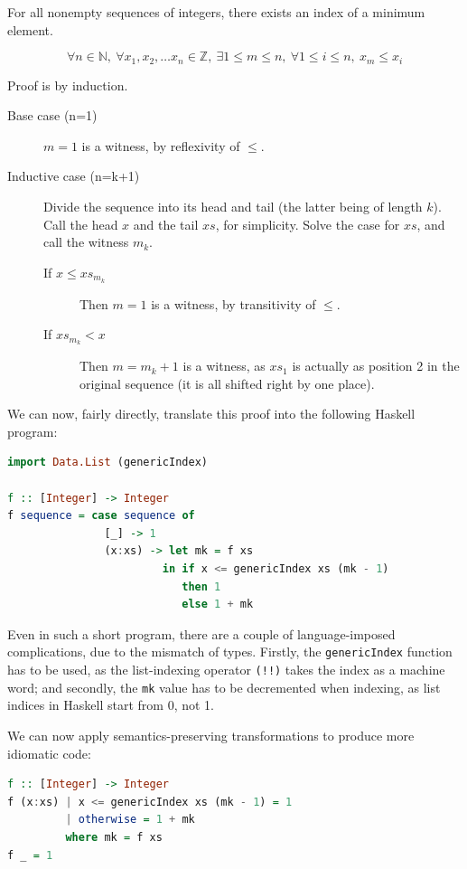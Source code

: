 \begin{example}
\label{exmpl:lit-extraction}
For all nonempty sequences of integers, there exists an index of a
minimum element.

\[\forall n \in \mathbb N,\
\forall x_{1}, x_{2}, \ldots x_{n} \in \mathbb Z,\ 
\exists 1 \leq m \leq n,\ 
\forall 1 \leq i \leq n,\ 
x_{m} \leq x_{i}\]

Proof is by induction.

\begin{description}
  \item[Base case (n=1)] $m = 1$ is a witness, by reflexivity of
    $\leq$.

  \item[Inductive case (n=k+1)] Divide the sequence into its head
    and tail (the latter being of length $k$). Call the head $x$ and
    the tail $xs$, for simplicity. Solve the case for $xs$, and call
    the witness $m_{k}$.
    \begin{description}
      \item[If $x \leq xs_{m_k}$] Then $m = 1$ is a witness, by
        transitivity of $\leq$.

      \item[If $xs_{m_k} < x$] Then $m = m_{k} + 1$ is a witness, as
        $xs_{1}$ is actually as position 2 in the original sequence
        (it is all shifted right by one place).
    \end{description}
\end{description}

We can now, fairly directly, translate this proof into the following
Haskell program:

\begin{lstlisting}[language=haskell]
import Data.List (genericIndex)

f :: [Integer] -> Integer
f sequence = case sequence of
               [_] -> 1
               (x:xs) -> let mk = f xs
                        in if x <= genericIndex xs (mk - 1)
                           then 1
                           else 1 + mk
\end{lstlisting}

Even in such a short program, there are a couple of language-imposed
complications, due to the mismatch of types. Firstly, the
\texttt{genericIndex} function has to be used, as the list-indexing
operator \texttt{(!!)} takes the index as a machine word; and
secondly, the \texttt{mk} value has to be decremented when indexing,
as list indices in Haskell start from 0, not 1.

We can now apply semantics-preserving transformations to produce more
idiomatic code:

\begin{lstlisting}[language=haskell]
f :: [Integer] -> Integer
f (x:xs) | x <= genericIndex xs (mk - 1) = 1
         | otherwise = 1 + mk
         where mk = f xs
f _ = 1
\end{lstlisting}
\end{example}


